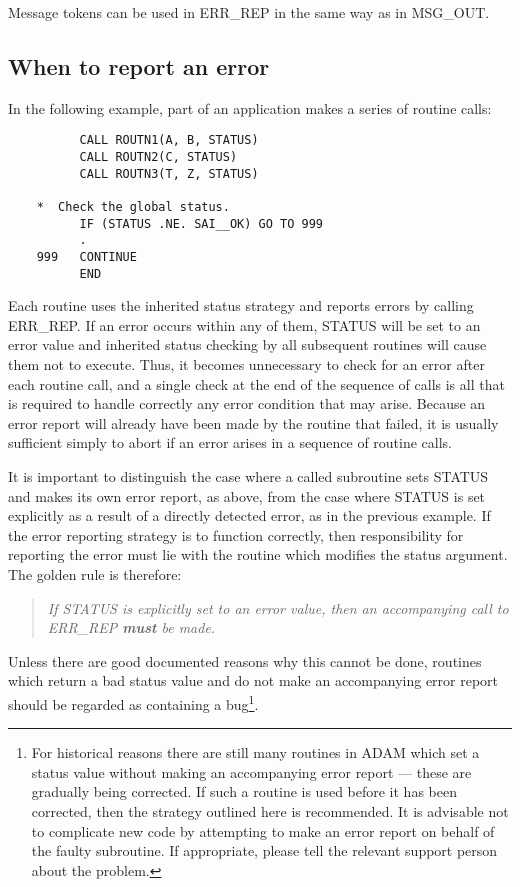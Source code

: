 Message tokens can be used in ERR\_REP in the same way as in MSG\_OUT.

\subsection{When to report an error}

In the following example, part of an application makes a series of routine
calls:

\begin{small}
\begin{verbatim}
          CALL ROUTN1(A, B, STATUS)
          CALL ROUTN2(C, STATUS)
          CALL ROUTN3(T, Z, STATUS)

    *  Check the global status.
          IF (STATUS .NE. SAI__OK) GO TO 999
          .
    999   CONTINUE
          END
\end{verbatim}
\end{small}

Each routine uses the inherited status strategy and reports errors by calling
ERR\_REP.
If an error occurs within any of them, STATUS will be set to an error value
and inherited status checking by all subsequent routines will cause them not
to execute. 
Thus, it becomes unnecessary to check for an error after each routine call,
and a single check at the end of the sequence of calls is all that is required
to handle correctly any error condition that may arise.
Because an error report will already have been made by the routine that failed,
it is usually sufficient simply to abort if an error arises in a sequence of
routine calls.

It is important to distinguish the case where a called subroutine sets STATUS 
and makes its own error report, as above, from the case where STATUS is set 
explicitly as a result of a directly detected error, as in the previous example.
If the error reporting strategy is to function correctly, then responsibility 
for reporting the error must lie with the routine which modifies the status 
argument.
The golden rule is therefore:

\begin {quote}
{\em If STATUS is explicitly set to an error value, then an accompanying
call to ERR\_REP {\bf must} be made.} 
\end {quote}

Unless there are good documented reasons why this cannot be done,
routines which return a bad status value and do not make an accompanying
error report should be regarded as containing a bug\footnote{For historical
reasons there are still many routines in ADAM which set a status value without
making an accompanying error report --- these are gradually being corrected. 
If such a routine is used before it has been corrected, then the strategy 
outlined here is recommended.
It is advisable not to complicate new code by attempting to make an error
report on behalf of the faulty subroutine.
If appropriate, please tell the relevant support person about the problem.}.

